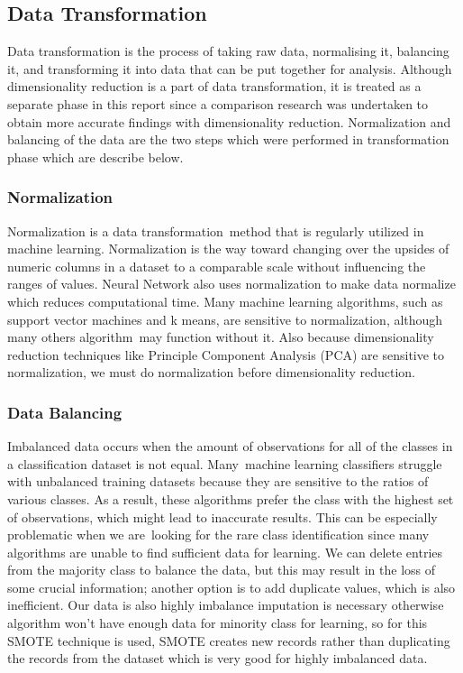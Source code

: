 \documentclass[12pt]{article}
\begin{document}
\subsection{Data Transformation}
Data transformation is the process of taking raw data, normalising it, balancing it, and transforming it into data that can be put together for analysis. Although dimensionality reduction is a part of data transformation, it is treated as a separate phase in this report since a comparison research was undertaken to obtain more accurate findings with dimensionality reduction. Normalization and balancing of the data are the two steps which were performed in transformation phase which are describe below.
\subsubsection{Normalization}
Normalization is a data transformation method that is regularly utilized in machine learning. Normalization is the way toward changing over the upsides of numeric columns in a dataset to a comparable scale without influencing the ranges of values. Neural Network also uses normalization to make data normalize which reduces computational time. Many machine learning algorithms, such as support vector machines and k means, are sensitive to normalization, although many others algorithm may function without it. Also because dimensionality reduction techniques like Principle Component Analysis (PCA) are sensitive to normalization, we must do normalization before dimensionality reduction.

\subsubsection{Data Balancing}
Imbalanced data occurs when the amount of observations for all of the classes in a classification dataset is not equal. Many machine learning classifiers struggle with unbalanced training datasets because they are sensitive to the ratios of various classes. As a result, these algorithms prefer the class with the highest set of observations, which might lead to inaccurate results. This can be especially problematic when we are looking for the rare class identification since many algorithms are unable to find sufficient data for learning. We can delete entries from the majority class to balance the data, but this may result in the loss of some crucial information; another option is to add duplicate values, which is also inefficient. Our data is also highly imbalance imputation is necessary otherwise algorithm won't have enough data for minority class for learning, so for this SMOTE technique is used, SMOTE creates new records rather than duplicating the records from the dataset which is very good for highly imbalanced data.
\end{document}
